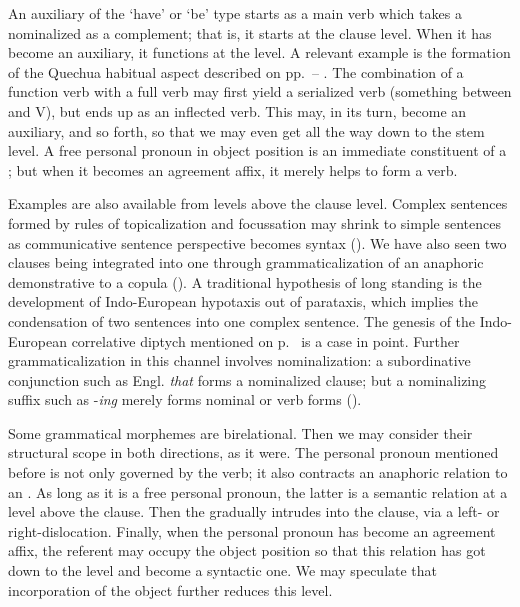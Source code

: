 An auxiliary of the ‘have’ or ‘be’ type starts as a main verb which takes a nominalized \vp as a complement; that is, it starts at the clause level. When it has become an auxiliary, it functions at the \vp level. A relevant example is the formation of the Quechua habitual aspect described on pp.~\pageref{page33b}--\pageref{page34}\chk%
. The combination of a function verb with a full verb may first yield a serialized verb (something between \vp and V), but ends up as an inflected verb. This may, in its turn, become an auxiliary, and so forth, so that we may even get all the way down to the stem level. A free personal pronoun in object position is an immediate constituent of a \vp; but when it becomes an agreement affix, it merely helps to form a verb.

Examples are also available from levels above the clause level. Complex sentences formed by rules of topicalization and focussation may shrink to simple sentences as communicative sentence perspective becomes syntax (). We have also seen two clauses being integrated into one through grammaticalization of an anaphoric demonstrative to a copula (). A traditional hypothesis of long standing is the development of Indo-European hypotaxis out of parataxis, which implies the condensation of two sentences into one complex sentence. The genesis of the Indo-European correlative diptych mentioned on p.~\pageref{page125b}\chk%
 is a case in point. Further grammaticalization in this channel involves nominalization: a subordinative conjunction such as Engl. \textit{that} forms a nominalized clause; but a nominalizing suffix such as -\textit{ing} merely forms nominal \vps or verb forms ().

Some grammatical morphemes are birelational. Then we may consider their structural scope in both directions, as it were. The personal pronoun mentioned before is not only governed by the verb; it also contracts an anaphoric relation to an \np. As long as it is a free personal pronoun, the latter is a semantic relation at a level above the clause. Then the \np gradually intrudes into the clause, via a left- or right-dislocation. Finally, when the personal pronoun has become an agreement affix, the referent \np may occupy the object position so that this relation has got down to the \vp level and become a syntactic one. We may speculate that incorporation of the object further reduces this level.

